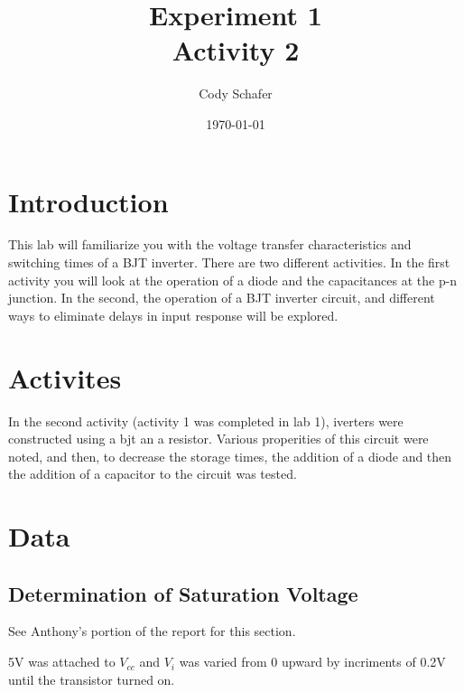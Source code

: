 \documentclass[10pt]{report}
\title{\textbf{Experiment 1} \\
	Activity 2}
\author{Cody Schafer}
\date{\today}
\begin{document}
\maketitle
\section{Introduction}

	This lab will familiarize you with the voltage transfer
	characteristics and switching times of a BJT inverter.  There are
	two different activities.  In the first activity you will look at
	the operation of a diode and the capacitances at the p-n junction.
	In the second, the operation of a BJT inverter circuit, and
	different ways to eliminate delays in input response will be
	explored.    

\section{Activites}

	In the second activity (activity 1 was completed in lab 1),
	iverters were constructed using a bjt an a resistor. Various
	properities of this circuit were noted, and then, to decrease the
	storage times, the addition of a diode and then the addition of a
	capacitor to the circuit was tested.

\section{Data}

	\subsection{Determination of Saturation Voltage}

	See Anthony's portion of the report for this section.

	5V was attached to $V_{cc}$ and $V_i$ was varied from 0 upward by
	incriments of 0.2V until the transistor turned on.
\end{document}
